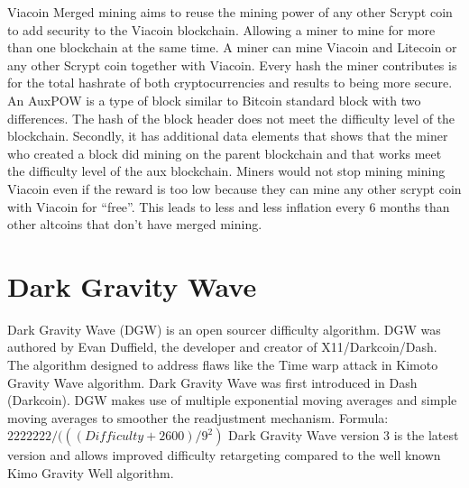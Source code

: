 \documentclass{article}
\begin{document}
Viacoin \cite{auxpow}Merged mining aims to reuse the mining power of any other \cite{scrypt}Scrypt coin
to add security to the Viacoin blockchain.
Allowing a miner to mine for more than one blockchain at the same time. A miner
can mine Viacoin and Litecoin or any other Scrypt coin together with Viacoin.
\newline \newline \noindent
Every hash the miner contributes is for the total hashrate of both
cryptocurrencies and results to being more secure.
An AuxPOW is a type of block similar to Bitcoin standard block with two
differences. The hash of the block header does not meet the difficulty level of the
blockchain. Secondly, it has additional data elements that shows that the miner
who created a block did mining on the parent blockchain and that works meet
the difficulty level of the aux blockchain. 
\newline \newline \noindent
Miners would not stop mining mining
Viacoin even if the reward is too low because they can mine any other scrypt
coin with Viacoin for “free”. This leads to less and less inflation every 6 months
than other altcoins that don’t have merged mining.
\newpage

\section{Dark Gravity Wave}\label{sec: Dark Gravity Wave}
\cite{darkGravityWave}Dark Gravity Wave (DGW) is an open sourcer difficulty algorithm. DGW was
authored by Evan Duffield, the developer and creator of X11/Darkcoin/Dash.
The algorithm designed to address flaws like the Time warp attack in Kimoto
Gravity Wave algorithm. 
\newline \newline \noindent
Dark Gravity Wave was first introduced in Dash
(Darkcoin). DGW makes use of multiple exponential moving averages and simple
moving averages to smoother the readjustment mechanism.
\newline Formula: \newline \newline
$2222222/ (((Difficulty+2600)/9^2)$ \newline \newline \noindent
Dark Gravity Wave version 3 is the latest version and allows improved difficulty retargeting compared
to the well known Kimo Gravity Well algorithm.
\end{document}
